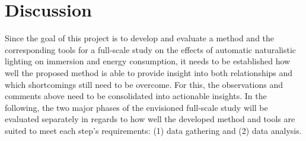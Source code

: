 \documentclass[12pt,twoside,english]{article}
\begin{document}
\section{Discussion}
\label{sect:discussion}

Since the goal of this project is to develop and evaluate a method and the corresponding tools for a full-scale study on the effects of automatic naturalistic lighting on immersion and energy consumption, it needs to be established how well the proposed method is able to provide insight into both relationships and which shortcomings still need to be overcome.
For this, the observations and comments above need to be consolidated into actionable insights.
In the following, the two major phases of the envisioned full-scale study will be evaluated separately in regards to how well the developed method and tools are suited to meet each step's requirements: (1) data gathering and (2) data analysis.
\end{document}
